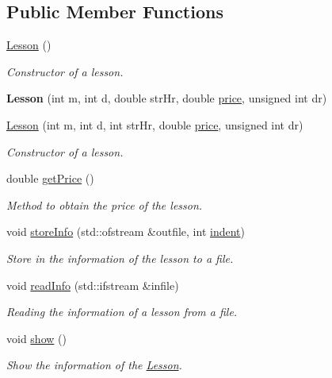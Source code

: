 \subsection*{Public Member Functions}
\begin{DoxyCompactItemize}
\item 
\mbox{\label{class_lesson_a1f6ed0da97171480b7d6d5696d6f2afc}} 
\mbox{\hyperlink{class_lesson_a1f6ed0da97171480b7d6d5696d6f2afc}{Lesson}} ()
\begin{DoxyCompactList}\small\item\em Constructor of a lesson. \end{DoxyCompactList}\item 
\mbox{\label{class_lesson_a2f2402e828e9ebdd7c90e712dc1164bd}} 
{\bfseries Lesson} (int m, int d, double str\+Hr, double \mbox{\hyperlink{class_reservation_a82e197bd30e7949ee9b8616ee4eacf83}{price}}, unsigned int dr)
\item 
\mbox{\hyperlink{class_lesson_a2d02413d32e4df560bcdb8cc9d00f7d7}{Lesson}} (int m, int d, int str\+Hr, double \mbox{\hyperlink{class_reservation_a82e197bd30e7949ee9b8616ee4eacf83}{price}}, unsigned int dr)
\begin{DoxyCompactList}\small\item\em Constructor of a lesson. \end{DoxyCompactList}\item 
double \mbox{\hyperlink{class_lesson_ad7a2f708f870040627a442cdf000683f}{get\+Price}} ()
\begin{DoxyCompactList}\small\item\em Method to obtain the price of the lesson. \end{DoxyCompactList}\item 
void \mbox{\hyperlink{class_lesson_a645855060ab3c915a6e0875bc5584887}{store\+Info}} (std\+::ofstream \&outfile, int \mbox{\hyperlink{class_reservation_a480981ed050bae19bc74bbb0bbb459f9}{indent}})
\begin{DoxyCompactList}\small\item\em Store in the information of the lesson to a file. \end{DoxyCompactList}\item 
void \mbox{\hyperlink{class_lesson_a3ac64e2f79bc9e381634d5d30499e8f1}{read\+Info}} (std\+::ifstream \&infile)
\begin{DoxyCompactList}\small\item\em Reading the information of a lesson from a file. \end{DoxyCompactList}\item 
\mbox{\label{class_lesson_add2dea9a07935a757249e1c0ed0d79e1}} 
void \mbox{\hyperlink{class_lesson_add2dea9a07935a757249e1c0ed0d79e1}{show}} ()
\begin{DoxyCompactList}\small\item\em Show the information of the \mbox{\hyperlink{class_lesson}{Lesson}}. \end{DoxyCompactList}\end{DoxyCompactItemize}
